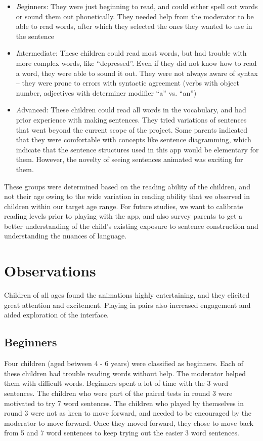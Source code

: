 \documentclass{sigchi-ext}
\begin{document}
\begin{itemize}\compresslist
\item 
\emph Beginners: They were just beginning to read, and could either spell out words or sound them out phonetically. They needed help from the moderator to be able to read words, after which they selected the ones they wanted to use in the sentence
\item 	
\emph Intermediate: These children could read most words, but had trouble with more complex words, like ``depressed''. Even if they did not know how to read a word, they were able to sound it out. They were not always aware of syntax – they were prone to errors with syntactic agreement (verbs with object number, adjectives with determiner modifier ``a'' vs. ``an'')
\item 	
\emph Advanced: These children could read all words in the vocabulary, and had prior experience with making sentences. They tried variations of sentences that went beyond the current scope of the project. Some parents indicated that they were comfortable with concepts like sentence diagramming, which indicate that the sentence structures used in this app would be elementary for them. However, the novelty of seeing sentences animated was exciting for them.
\end{itemize}

These groups were determined based on the reading ability of the children, and not their age owing to the wide variation in reading ability that we observed in children within our target age range. For future studies, we want to calibrate reading levels prior to playing with the app, and also survey parents to get a better understanding of the child’s existing exposure to sentence construction and understanding the nuances of language.


\section{Observations}
Children of all ages found the animations highly entertaining, and they elicited great attention and excitement. Playing in pairs also increased engagement and aided exploration of the interface.

\subsection{Beginners}
Four children (aged between 4 - 6 years) were classified as beginners.  Each of these children had trouble reading words without help. The moderator helped them with difficult words. Beginners spent a lot of time with the 3 word sentences. The children who were part of the paired tests in round 3 were motivated to try 7 word sentences. The children who played by themselves in round 3 were not as keen to move forward, and needed to be encouraged by the moderator to move forward. Once they moved forward, they chose to move back from 5 and 7 word sentences to keep trying out the easier 3 word sentences.
\end{document}

